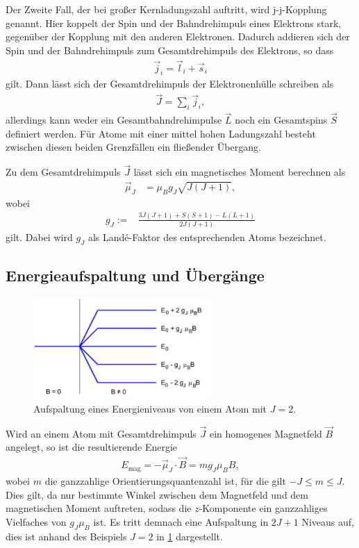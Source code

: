 Der Zweite Fall, der bei großer Kernladungszahl auftritt, wird j-j-Kopplung genannt.
Hier koppelt der Spin und der Bahndrehimpuls eines Elektrons stark,
gegenüber der Kopplung mit den anderen Elektronen.
Dadurch addieren sich der Spin und der Bahndrehimpuls zum Gesamtdrehimpuls des Elektrons, so dass
\begin{align}
	\vec{j}_i=\vec{l}_i+\vec{s}_i
\end{align}
gilt.
Dann lässt sich der Gesamtdrehimpuls der Elektronenhülle schreiben als
\begin{align}
	\vec{J}=\sum_i\vec{j}_i,
\end{align}
allerdings kann weder ein Gesamtbahndrehimpulse $\vec{L}$
noch ein Gesamtspins $\vec{S}$ definiert werden.
Für Atome mit einer mittel hohen Ladungszahl besteht zwischen diesen beiden Grenzfällen ein fließender Übergang.

Zu dem Gesamtdrehimpuls $\vec{J}$ lässt sich ein magnetisches Moment berechnen als
\begin{align}
	\vec{\mu}_J&=\mu_Bg_J\sqrt{J(J+1)},
\end{align}
wobei
\begin{align}
		g_J:=&\frac{3J(J+1)+S(S+1)-L(L+1)}{2J(J+1)}
\end{align}
gilt.
Dabei wird $g_J$ als Landé-Faktor des entsprechenden Atoms bezeichnet.
\subsection{Energieaufspaltung und Übergänge}
\begin{figure}[h!]
	\centering
	\includegraphics[width=0.6\textwidth]{../Grafiken/fig_theo_Aufspaltung.pdf}
	\caption{Aufspaltung eines Energieniveaus von einem Atom mit $J=2$. \cite{V27}}\label{fig:Theo_Aufspaltung}
\end{figure}
\noindent
Wird an einem Atom mit Gesamtdrehimpuls $\vec{J}$ ein homogenes Magnetfeld
$\vec{B}$ angelegt, so ist die resultierende Energie
\begin{align}
	E_\text{mag}= -\vec{\mu}_J\cdot\vec{B}=mg_J\mu_BB,
\end{align}
wobei $m$ die ganzzahlige Orientierungsquantenzahl ist, für die gilt $-J\le m\le J$.
Dies gilt, da nur bestimmte Winkel zwischen dem Magnetfeld und dem magnetischen Moment auftreten,
sodass die $z$-Komponente ein ganzzahliges Vielfaches von $g_J\mu_B$ ist.
Es tritt demnach eine Aufspaltung in $2J+1$ Niveaus auf, dies ist anhand des
Beispiels $J=2$ in \cref{fig:Theo_Aufspaltung} dargestellt.

